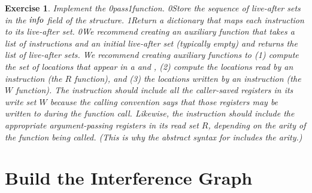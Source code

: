 \documentclass[7x10]{TimesAPriori_MIT}%
\def\racketEd{0}
\def\pythonEd{1}
\def\edition{1}
\newcommand{\racket}[1]{{\if\edition\racketEd{#1}\fi}}
\newcommand{\pythonColor}[0]{}
\newcommand{\python}[1]{{\if\edition\pythonEd\pythonColor #1\fi}}
\newtheorem{exercise}[theorem]{Exercise}
\numberwithin{theorem}{chapter}
\numberwithin{definition}{chapter}
\numberwithin{equation}{chapter}
\begin{document}
\begin{exercise}\normalfont\normalsize
  Implement the  \racket{pass}\python{function}.
\racket{Store the sequence of live-after sets in the $\mathit{info}$
  field of the \code{Block} structure.}
%
\python{Return a dictionary that maps each instruction to its
  live-after set.}
%
\racket{We recommend creating an auxiliary function that takes a list
  of instructions and an initial live-after set (typically empty) and
  returns the list of live-after sets.}
%
We recommend creating auxiliary functions to (1) compute the set
of locations that appear in a \Src{} and \Dst, (2) compute the locations read
by an instruction (the $R$ function), and (3) the locations written by
an instruction (the $W$ function). The  instruction should
include all the caller-saved registers in its write set $W$ because
the calling convention says that those registers may be written to
during the function call. Likewise, the  instruction
should include the appropriate argument-passing registers in its
read set $R$, depending on the arity of the function being
called. (This is why the abstract syntax for  includes the
arity.)
\end{exercise}


\section{Build the Interference Graph}
\label{sec:build-interference}
\end{document}
